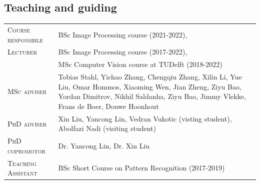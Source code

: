 \documentclass[a4paper, oneside, final]{scrartcl}
\begin{document}
\begin{center}
		\section{Teaching and guiding}
        \begin{tabular}{p{3.5cm}@{\hskip 0.3in}p{12.3cm}}
			\textsc{Course responsible}		    & BSc Image Processing course (2021-2022),\\
			\textsc{Lecturer}		            & BSc Image Processing course (2017-2022),\\
                                                & MSc Computer Vision course at TUDelft (2018-2022)\\
			\textsc{MSc adviser}                & Tobias Stahl, Yichao Zhang, Chengqiu Zhang, Xilin Li, Yue Liu, Omar Hommos, Xiaoming Wen, Jian Zheng, Ziyu Bao, Yordan Dimitrov, Nikhil Saldanha, Ziyu Bao, Jimmy Vlekke, Frans de Boer, Douwe Hoonhout\\
			\textsc{PhD adviser}                & Xin Liu, Yancong Lin, Vedran Vukotic (visting student), Abolfazi Nadi (visiting student)\\ 
			\textsc{PhD copromotor}             & Dr. Yancong Lin, Dr. Xin Liu\\ 
            \textsc{Teaching Assistant}         & BSc Short Course on Pattern Recognition (2017-2019)\\
		\end{tabular}

\end{center}
\end{document}
